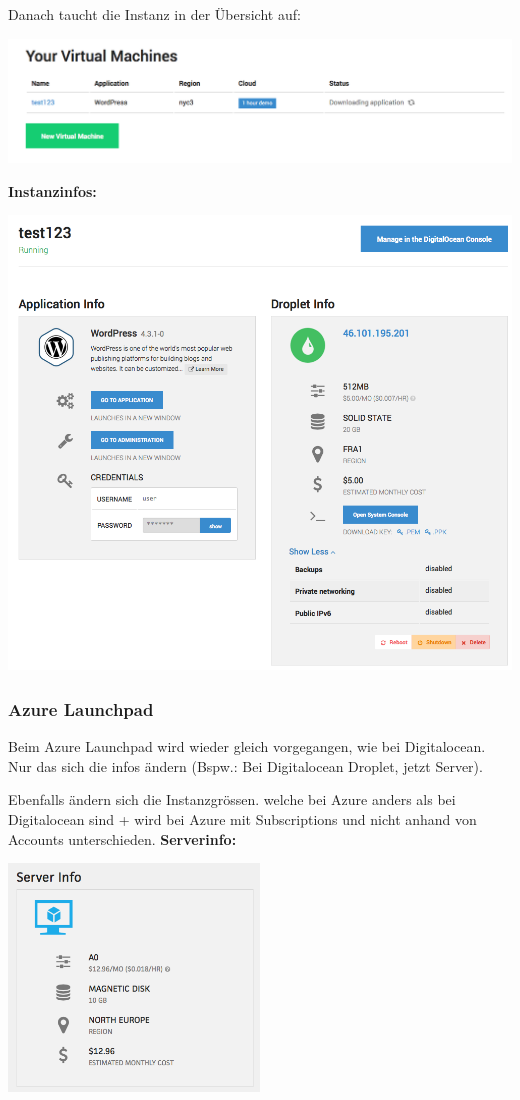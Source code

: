 \documentclass[11pt]{scrartcl}
\begin{document}
Danach taucht die Instanz in der Übersicht auf:

\includegraphics[width=\textwidth]{digitalocean_instances}

\newpage
\textbf{Instanzinfos:}

\includegraphics[width=\textwidth]{digitalocean_instanceinfo}

\subsubsection{Azure Launchpad}
Beim Azure Launchpad wird wieder gleich vorgegangen, wie bei Digitalocean.
Nur das sich die infos ändern (Bspw.: Bei Digitalocean Droplet, jetzt Server).

Ebenfalls ändern sich die Instanzgrössen. welche bei Azure anders als bei 
Digitalocean sind + wird bei Azure mit Subscriptions und nicht anhand von 
Accounts unterschieden.
\textbf{Serverinfo:}

\includegraphics[width=0.5\textwidth]{azure_serverinfo}
\end{document}

